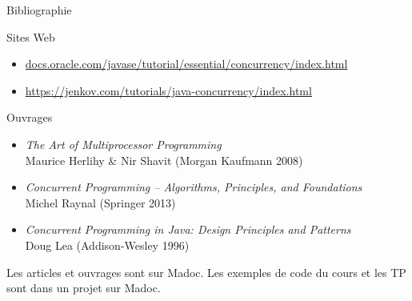 
\begingroup

\begin{frame}{Bibliographie}

  \begin{block}{Sites Web}
    \begin{itemize}
    \item \href{http://docs.oracle.com/javase/tutorial/essential/concurrency/index.html}{docs.oracle.com/javase/tutorial/essential/concurrency/index.html}
    \item \href{https://jenkov.com/tutorials/java-concurrency/index.html}{https://jenkov.com/tutorials/java-concurrency/index.html}
    \end{itemize}
  \end{block}

  \vfill

  \begin{block}{Ouvrages}
    \begin{itemize}
    \item \textit{The Art of Multiprocessor Programming}\\ Maurice Herlihy \& Nir Shavit (Morgan Kaufmann 2008)
    \item \textit{Concurrent Programming -- Algorithms, Principles, and Foundations}\\ Michel Raynal (Springer 2013)
    \item \textit{Concurrent Programming in Java: Design Principles and Patterns}\\ Doug Lea (Addison-Wesley 1996)
    \end{itemize}
  \end{block}
  
  \vfill
  \vfill
  
  \begin{citing}
  \item Les articles et ouvrages sont sur Madoc.
    \jitem Les exemples de code du cours et les TP sont dans un projet sur Madoc.
  \end{citing}
\end{frame}

\endgroup
\endinput
